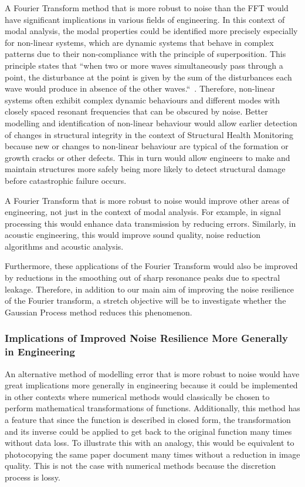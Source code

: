 \documentclass[12pt]{article}
\begin{document}
    A Fourier Transform method that is more robust to noise than the FFT would have significant implications in various fields of engineering.
    In this context of modal analysis, the modal properties could be identified more precisely especially for non-linear systems, which are dynamic systems that behave in complex patterns due to their non-compliance with the principle of superposition.
    This principle states that ``when two or more waves simultaneously pass through a point, the disturbance at the point is given by the sum of the disturbances each wave would produce in absence of the other waves.``~\cite{StudyComSuperposition}.
    Therefore, non-linear systems often exhibit complex dynamic behaviours and different modes with closely spaced resonant frequencies that can be obscured by noise.
    Better modelling and identification of non-linear behaviour would allow earlier detection of changes in structural integrity in the context of Structural Health Monitoring because new or changes to non-linear behaviour are typical of the formation or growth cracks or other defects.
    This in turn would allow engineers to make and maintain structures more safely being more likely to detect structural damage before catastrophic failure occurs.

    A Fourier Transform that is more robust to noise would improve other areas of engineering, not just in the context of modal analysis.
    For example, in signal processing this would enhance data transmission by reducing errors.
    Similarly, in acoustic engineering, this would improve sound quality, noise reduction algorithms and acoustic analysis.

    Furthermore, these applications of the Fourier Transform would also be improved by reductions in the smoothing out of sharp resonance peaks due to spectral leakage.
    Therefore, in addition to our main aim of improving the noise resilience of the Fourier transform, a stretch objective will be to investigate whether the Gaussian Process method reduces this phenomenon.

    \subsubsection{Implications of Improved Noise Resilience More Generally in Engineering}

    An alternative method of modelling error that is more robust to noise would have great implications more generally in engineering because it could be implemented in other contexts where numerical methods would classically be chosen to perform mathematical transformations of functions.
    Additionally, this method has a feature that since the function is described in closed form, the transformation and its inverse could be applied to get back to the original function many times without data loss.
    To illustrate this with an analogy, this would be equivalent to photocopying the same paper document many times without a reduction in image quality.
    This is not the case with numerical methods because the discretion process is lossy.
\end{document}
